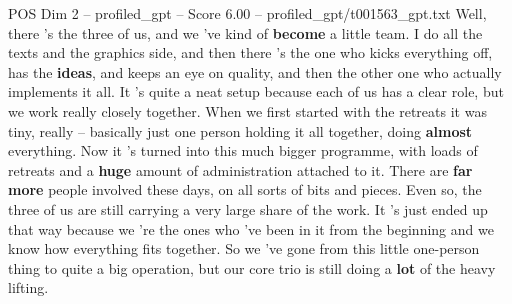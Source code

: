 \begin{textsample}{POS Dim 2 – profiled\_gpt – Score 6.00 – profiled\_gpt/t001563\_gpt.txt}  \label{ex:f2_pos_010}
Well, there ’s the three of us, and we ’ve kind of \textbf{become} a little team.
I do all the texts and the graphics side, and then there ’s the one who kicks everything off, has the \textbf{ideas}, and keeps an eye on quality, and then the other one who actually implements it all.
It ’s quite a neat setup because each of us has a clear role, but we work really closely together.
When we first started with the retreats it was tiny, really – basically just one person holding it all together, doing \textbf{almost} everything.
Now it ’s turned into this much bigger programme, with loads of retreats and a \textbf{huge} amount of administration attached to it.
There are \textbf{far} \textbf{more} people involved these days, on all sorts of bits and pieces.
Even so, the three of us are still carrying a very large share of the work.
It ’s just ended up that way because we ’re the ones who ’ve been in it from the beginning and we know how everything fits together.
So we ’ve gone from this little one-person thing to quite a big operation, but our core trio is still doing a \textbf{lot} of the heavy lifting.

\end{textsample}
